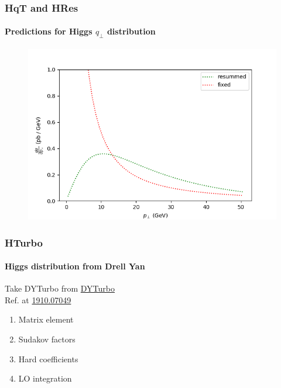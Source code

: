 \documentclass[aspectratio=43]{beamer}
\begin{document}
\begin{frame}


\end{frame}

\begin{frame}

	\frametitle{HqT and HRes}
	\framesubtitle{Predictions for Higgs $q_{\perp}$ distribution}
	
	\begin{figure}
		\includegraphics[width = 7 cm]{plots/hqt_resummed.png}
	\end{figure}
\end{frame}

\begin{frame}

	\frametitle{HTurbo}
	\framesubtitle{Higgs distribution from Drell Yan}
	Take DYTurbo from \href{https://dyturbo.hepforge.org/}{DYTurbo}\\
	Ref. at \href{https://arxiv.org/abs/1910.07049}{1910.07049}
	\begin{enumerate}
		\item Matrix element
		\item Sudakov factors
		\item Hard coefficients 
		\item LO integration
	\end{enumerate}

\end{frame}
\end{document}
